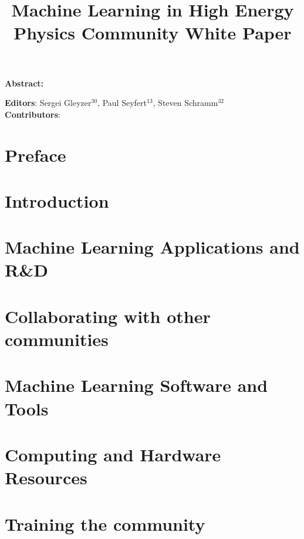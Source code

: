 \documentclass{article}
\begin{document}
\title{Machine Learning in High Energy Physics Community White Paper}

\maketitle

\setlength\parindent{0pt}
\textbf{Abstract:}

\vskip 1cm
\textbf{Editors}: Sergei Gleyzer$^{30}$, Paul Seyfert$^{13}$, Steven Schramm$^{32}$\\
\newline
\textbf{Contributors}:


\tableofcontents
\clearpage

\section{Preface}
\label{sec:preface}


\section{Introduction}
\label{sec:introduction}


\section{Machine Learning Applications and R\&D}
\label{sec:applications}


\section{Collaborating with other communities}
\label{sec:collaboration}


\section{Machine Learning Software and Tools}
\label{sec:software}


\section{Computing and Hardware Resources}
\label{sec:resources}


\section{Training the community}
\label{sec:training}

\end{document}
